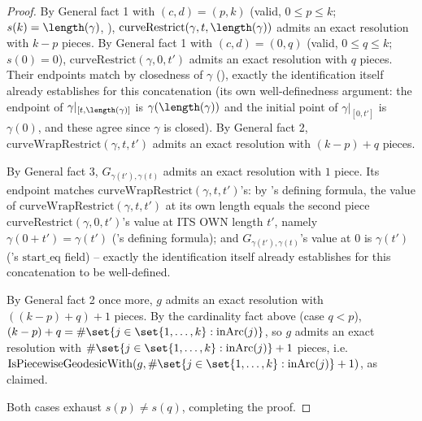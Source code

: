 \begin{proof}
  By General fact 1 with $(c,d)=(p,k)$ (valid, $0\le p\le k$; $s(k)=\length(\gamma)$,
  ), $\mathrm{curveRestrict}(\gamma,t,\length(\gamma))$ admits an exact
  resolution with $k-p$ pieces. By General fact 1 with $(c,d)=(0,q)$ (valid, $0\le q\le k$;
  $s(0)=0$), $\mathrm{curveRestrict}(\gamma,0,t')$ admits an exact resolution with $q$ pieces. Their
  endpoints match by closedness of $\gamma$ (), exactly the identification
   itself already establishes for this concatenation (its own
  well-definedness argument: the endpoint of $\gamma|_{[t,\length(\gamma)]}$ is
  $\gamma(\length(\gamma))$ and the initial point of $\gamma|_{[0,t']}$ is $\gamma(0)$, and these
  agree since $\gamma$ is closed). By General fact 2, $\mathrm{curveWrapRestrict}(\gamma,t,t')$
  admits an exact resolution with $(k-p)+q$ pieces.

  By General fact 3, $G_{\gamma(t'),\gamma(t)}$ admits an exact resolution with $1$ piece. Its
  endpoint matches $\mathrm{curveWrapRestrict}(\gamma,t,t')$'s: by 's defining
  formula, the value of $\mathrm{curveWrapRestrict}(\gamma,t,t')$ at its own length equals the
  second piece $\mathrm{curveRestrict}(\gamma,0,t')$'s value at ITS OWN length $t'$, namely
  $\gamma(0+t')=\gamma(t')$ ('s defining formula); and
  $G_{\gamma(t'),\gamma(t)}$'s value at $0$ is $\gamma(t')$ ('s
  $\mathrm{start\_eq}$ field) -- exactly the identification  itself already
  establishes for this concatenation to be well-defined.

  By General fact 2 once more, $g$ admits an exact resolution with $((k-p)+q)+1$ pieces. By the
  cardinality fact above (case $q<p$), $(k-p)+q = \#\set{j\in\set{1,\dots,k}:\mathrm{inArc}(j)}$, so
  $g$ admits an exact resolution with $\#\set{j\in\set{1,\dots,k}:\mathrm{inArc}(j)}+1$ pieces, i.e.\
  $\mathrm{IsPiecewiseGeodesicWith}(g,\#\set{j\in\set{1,\dots,k}:\mathrm{inArc}(j)}+1)$, as claimed.

  Both cases exhaust $s(p)\ne s(q)$, completing the proof.
\end{proof}
